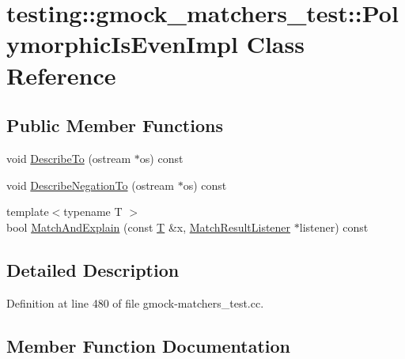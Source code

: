 \hypertarget{classtesting_1_1gmock__matchers__test_1_1_polymorphic_is_even_impl}{}\section{testing\+:\+:gmock\+\_\+matchers\+\_\+test\+:\+:Polymorphic\+Is\+Even\+Impl Class Reference}
\label{classtesting_1_1gmock__matchers__test_1_1_polymorphic_is_even_impl}
\subsection*{Public Member Functions}
\begin{DoxyCompactItemize}
\item 
void \hyperlink{classtesting_1_1gmock__matchers__test_1_1_polymorphic_is_even_impl_aa1ba79368840cfa6766405c8038a8695}{Describe\+To} (ostream $\ast$os) const 
\item 
void \hyperlink{classtesting_1_1gmock__matchers__test_1_1_polymorphic_is_even_impl_aa6ae4046ea5663d64cd21a7fb0686658}{Describe\+Negation\+To} (ostream $\ast$os) const 
\item 
{\footnotesize template$<$typename T $>$ }\\bool \hyperlink{classtesting_1_1gmock__matchers__test_1_1_polymorphic_is_even_impl_a85db513ebaeae37ee3f4b9d1b58fa94d}{Match\+And\+Explain} (const \hyperlink{functions__7_8js_adf1f3edb9115acb0a1e04209b7a9937b}{T} \&x, \hyperlink{classtesting_1_1_match_result_listener}{Match\+Result\+Listener} $\ast$listener) const 
\end{DoxyCompactItemize}


\subsection{Detailed Description}


Definition at line 480 of file gmock-\/matchers\+\_\+test.\+cc.



\subsection{Member Function Documentation}
